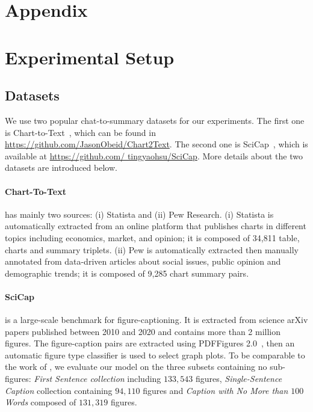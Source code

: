 \section*{Appendix}

 


\section{Experimental Setup}
\subsection{Datasets}\label{app:datasets}
We use two popular chat-to-summary datasets for our experiments. The first one is Chart-to-Text~\cite{kantharaj-etal-2022-chart}, which can be found in \url{https://github.com/JasonObeid/Chart2Text}. The second one is SciCap~\cite{hsu-etal-2021-scicap-generating}, which is available at \url{https://github.com/
tingyaohsu/SciCap}. More details about the two datasets are introduced below.

\paragraph{Chart-To-Text} has mainly two sources: (i) Statista and (ii) Pew Research. (i) Statista is automatically extracted from an online platform that publishes charts in different topics including economics, market, and opinion; it is composed of 34,811 table, charts and summary triplets. (ii) Pew is automatically extracted then manually annotated from data-driven articles about social issues, public opinion and demographic trends; it is composed of 9,285 chart summary pairs.

\paragraph{SciCap~\cite{hsu-etal-2021-scicap-generating}} is a large-scale benchmark for figure-captioning. It is extracted from science arXiv papers published between 2010 and 2020 and contains more than 2 million figures. The figure-caption pairs are extracted using PDFFigures 2.0~\cite{clark2016ieee}, then an automatic figure type classifier is used to select graph plots. To be comparable to the work of \citet{hsu-etal-2021-scicap-generating}, we evaluate our model on the three subsets containing no sub-figures: \emph{First Sentence collection} including $133,543$ figures, \emph{Single-Sentence Caption} collection containing $94,110$ figures and \emph{Caption with No More than $100$ Words} composed of $131,319$ figures.


